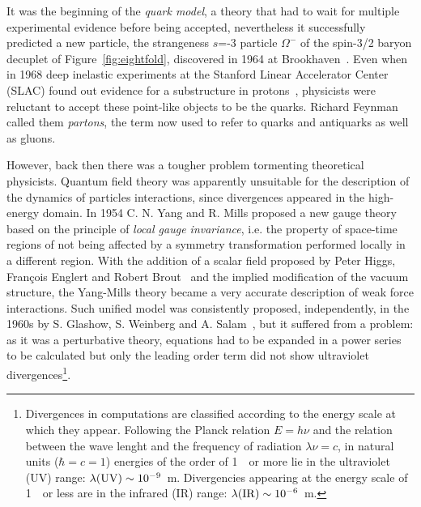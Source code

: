 It was the beginning of the {\it quark model}, a theory that had to 
wait for multiple experimental evidence before being accepted,
nevertheless it successfully predicted a new particle, the strangeness $s$=-3 
particle $\Omega^{-}$ of the spin-3/2 baryon decuplet of Figure~\ref{fig:eightfold},
discovered in 1964 at Brookhaven~\cite{PhysRevLett.12.204}. 
Even when in 1968 deep inelastic experiments at the Stanford 
Linear Accelerator Center (SLAC) found out evidence for a 
substructure in protons~\cite{PhysRevLett.23.930,PhysRevLett.23.935}, 
physicists were reluctant to accept 
these point-like objects to be the quarks. Richard Feynman called 
them \textit{partons}, the term now used to refer to quarks 
and antiquarks as well as gluons.

However, back then there was a tougher problem tormenting theoretical physicists. 
Quantum field theory was apparently unsuitable for the description 
of the dynamics of particles interactions, since divergences appeared in the 
high-energy domain. In 1954 C. N. Yang and R. Mills proposed a new gauge 
theory~\cite{PhysRev.96.191} based on the principle of {\it local gauge invariance},
i.e. the property of space-time regions of not being affected 
by a symmetry transformation performed 
locally in a different region. With the addition of a scalar 
field proposed by Peter Higgs, 
Fran\c{c}ois Englert and Robert 
Brout~\cite{PhysRevLett.13.321,PhysRevLett.13.508} and the implied 
modification of the vacuum structure, the Yang-Mills theory 
became a very accurate description of weak force interactions. 
Such unified model was consistently proposed, independently, in the 1960s by  
S. Glashow, S. Weinberg and A. Salam~\cite{Glashow1961579,PhysRevLett.19.1264,Salam},
but it suffered from a problem: 
as it was a perturbative theory, equations 
had to be expanded in a power series to be calculated but only the leading order 
term did not show ultraviolet divergences\footnote{Divergences in computations
are classified according to the energy scale at which they appear. Following
the Planck relation $E=h\nu$ and the relation between the wave lenght and
the frequency of radiation $\lambda\nu = c$, in natural units 
($\hbar=c=1$) energies of the order of 1~\tev\ 
or more lie in the ultraviolet (UV) range: $\lambda({\rm UV})\sim 10^{-9}$~m.
Divergencies appearing at the energy scale of 1~\gev\ or less are in the 
infrared (IR) range: $\lambda({\rm IR})\sim 10^{-6}$~m.}.

